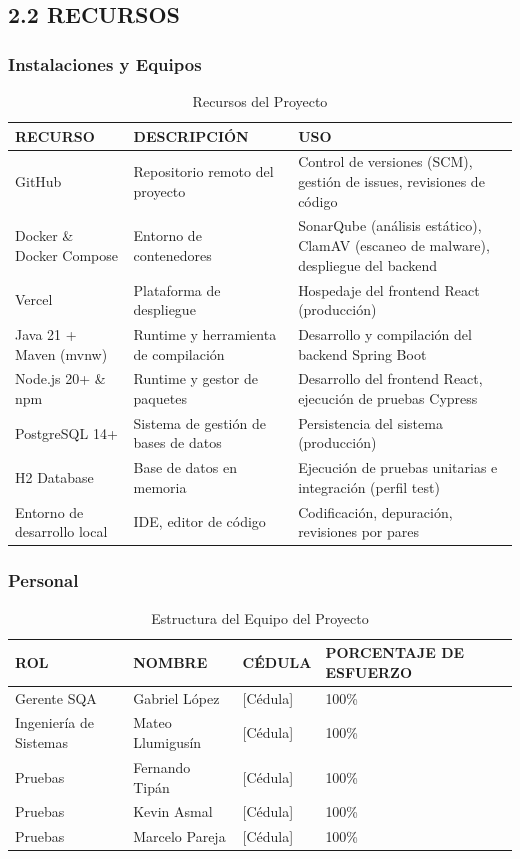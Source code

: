 \subsection{2.2 RECURSOS}

\subsubsection{ Instalaciones y Equipos}

\begin{table}[H]
\centering
\caption{Recursos del Proyecto}
\label{tab:resources}
\begin{tabular}{|p{4cm}|p{5cm}|p{5cm}|}
\hline
\textbf{RECURSO} & \textbf{DESCRIPCIÓN} & \textbf{USO} \\
\hline
GitHub & Repositorio remoto del proyecto & Control de versiones (SCM), gestión de issues, revisiones de código \\
\hline
Docker \& Docker Compose & Entorno de contenedores & SonarQube (análisis estático), ClamAV (escaneo de malware), despliegue del backend \\
\hline
Vercel & Plataforma de despliegue & Hospedaje del frontend React (producción) \\
\hline
Java 21 + Maven (mvnw) & Runtime y herramienta de compilación & Desarrollo y compilación del backend Spring Boot \\
\hline
Node.js 20+ \& npm & Runtime y gestor de paquetes & Desarrollo del frontend React, ejecución de pruebas Cypress \\
\hline
PostgreSQL 14+ & Sistema de gestión de bases de datos & Persistencia del sistema (producción) \\
\hline
H2 Database & Base de datos en memoria & Ejecución de pruebas unitarias e integración (perfil test) \\
\hline
Entorno de desarrollo local & IDE, editor de código & Codificación, depuración, revisiones por pares \\
\hline
\end{tabular}
\end{table}

\subsubsection{ Personal}

\begin{table}[H]
\centering
\caption{Estructura del Equipo del Proyecto}
\label{tab:team}
\begin{tabular}{|p{3.5cm}|p{4cm}|p{2cm}|p{3.5cm}|}
\hline
\textbf{ROL} & \textbf{NOMBRE} & \textbf{CÉDULA} & \textbf{PORCENTAJE DE ESFUERZO} \\
\hline
Gerente SQA & Gabriel López & [Cédula] & 100\% \\
\hline
Ingeniería de Sistemas & Mateo Llumigusín & [Cédula] & 100\% \\
\hline
Pruebas & Fernando Tipán & [Cédula] & 100\% \\
\hline
Pruebas & Kevin Asmal & [Cédula] & 100\% \\
\hline
Pruebas & Marcelo Pareja & [Cédula] & 100\% \\
\hline
\end{tabular}
\end{table}

